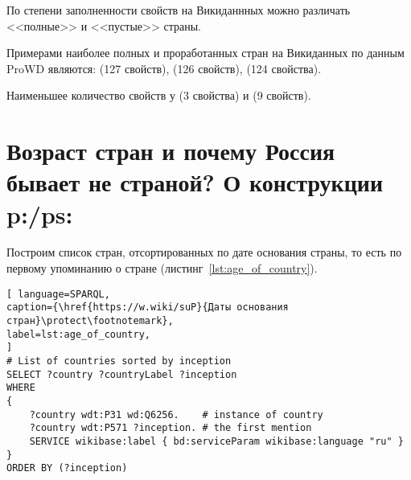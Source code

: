 По степени заполненности свойств на Викиданнных можно различать <<полные>> и  <<пустые>> страны. 

Примерами наиболее полных и проработанных стран на Викиданных по данным ProWD\autocite{prowd_balakireva} являются:  (127 свойств),  (126 свойств),  (124 свойства).

Наименьшее количество свойств у  (3 свойства) и  (9 свойств).

\section{Возраст стран и почему Россия бывает не страной? О конструкции p:/ps:}
\label{ch:RussiaNotCountryPPS}



Построим список стран, отсортированных по дате основания страны, то есть по первому упоминанию о стране (листинг~\ref{lst:age_of_country}).

\begin{lstlisting}[ language=SPARQL, 
caption={\href{https://w.wiki/suP}{Даты основания стран}\protect\footnotemark},
label=lst:age_of_country, 
]
# List of countries sorted by inception 
SELECT ?country ?countryLabel ?inception
WHERE
{
	?country wdt:P31 wd:Q6256.    # instance of country
	?country wdt:P571 ?inception. # the first mention
	SERVICE wikibase:label { bd:serviceParam wikibase:language "ru" }
}
ORDER BY (?inception)
\end{lstlisting}

